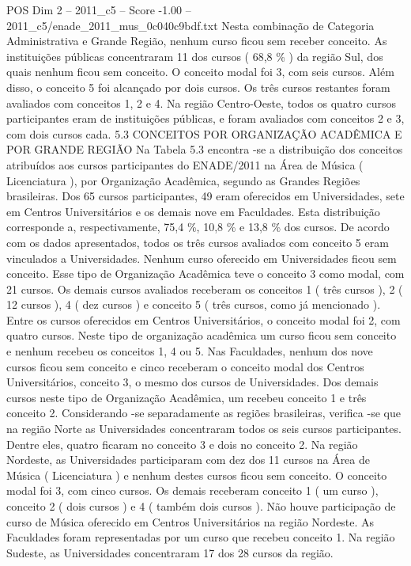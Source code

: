 \begin{textsample}{POS Dim 2 – 2011\_c5 – Score -1.00 – 2011\_c5/enade\_2011\_mus\_0c040c9bdf.txt}
Nesta combinação de Categoria Administrativa e Grande Região, nenhum curso ficou sem receber conceito.
As instituições públicas concentraram 11 dos cursos ( 68,8 \% ) da região Sul, dos quais nenhum ficou sem conceito.
O conceito modal foi 3, com seis cursos.
Além disso, o conceito 5 foi alcançado por dois cursos.
Os três cursos restantes foram avaliados com conceitos 1, 2 e 4.
Na região Centro-Oeste, todos os quatro cursos participantes eram de instituições públicas, e foram avaliados com conceitos 2 e 3, com dois cursos cada. 5.3 CONCEITOS POR ORGANIZAÇÃO ACADÊMICA E POR GRANDE REGIÃO Na Tabela 5.3 encontra -se a distribuição dos conceitos atribuídos aos cursos participantes do ENADE/2011 na Área de Música ( Licenciatura ), por Organização Acadêmica, segundo as Grandes Regiões brasileiras.
Dos 65 cursos participantes, 49 eram oferecidos em Universidades, sete em Centros Universitários e os demais nove em Faculdades.
Esta distribuição corresponde a, respectivamente, 75,4 \%, 10,8 \% e 13,8 \% dos cursos.
De acordo com os dados apresentados, todos os três cursos avaliados com conceito 5 eram vinculados a Universidades.
Nenhum curso oferecido em Universidades ficou sem conceito.
Esse tipo de Organização Acadêmica teve o conceito 3 como modal, com 21 cursos.
Os demais cursos avaliados receberam os conceitos 1 ( três cursos ), 2 ( 12 cursos ), 4 ( dez cursos ) e conceito 5 ( três cursos, como já mencionado ).
Entre os cursos oferecidos em Centros Universitários, o conceito modal foi 2, com quatro cursos.
Neste tipo de organização acadêmica um curso ficou sem conceito e nenhum recebeu os conceitos 1, 4 ou 5.
Nas Faculdades, nenhum dos nove cursos ficou sem conceito e cinco receberam o conceito modal dos Centros Universitários, conceito 3, o mesmo dos cursos de Universidades.
Dos demais cursos neste tipo de Organização Acadêmica, um recebeu conceito 1 e três conceito 2.
Considerando -se separadamente as regiões brasileiras, verifica -se que na região Norte as Universidades concentraram todos os seis cursos participantes.
Dentre eles, quatro ficaram no conceito 3 e dois no conceito 2.
Na região Nordeste, as Universidades participaram com dez dos 11 cursos na Área de Música ( Licenciatura ) e nenhum destes cursos ficou sem conceito.
O conceito modal foi 3, com cinco cursos.
Os demais receberam conceito 1 ( um curso ), conceito 2 ( dois cursos ) e 4 ( também dois cursos ).
Não houve participação de curso de Música oferecido em Centros Universitários na região Nordeste.
As Faculdades foram representadas por um curso que recebeu conceito 1.
Na região Sudeste, as Universidades concentraram 17 dos 28 cursos da região.

\end{textsample}
